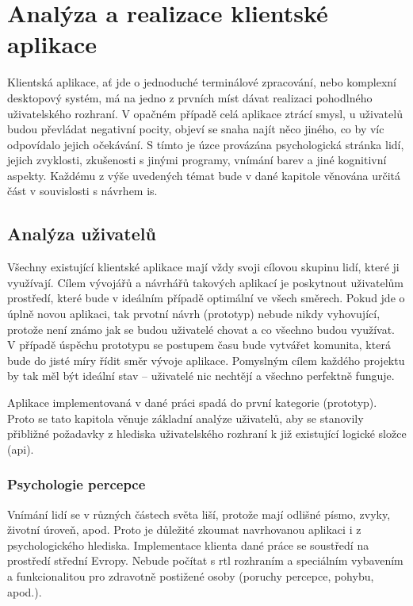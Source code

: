 \chapter{Analýza a realizace klientské aplikace}


Klientská aplikace, ať jde o jednoduché terminálové zpracování, nebo komplexní desktopový systém, má na jedno z prvních míst dávat realizaci pohodlného uživatelského rozhraní. V opačném případě celá aplikace ztrácí smysl, u uživatelů budou převládat negativní pocity, objeví se snaha najít něco jiného, co by víc odpovídalo jejich očekávání. S tímto je úzce provázána psychologická stránka lidí, jejich zvyklosti, zkušenosti s jinými programy, vnímání barev a jiné kognitivní aspekty. Každému z výše uvedených témat bude v dané kapitole věnována určitá část v souvislosti s návrhem \gls{is}.



\section{Analýza uživatelů}

Všechny existující klientské aplikace mají vždy svoji cílovou skupinu lidí, které ji využívají. Cílem vývojářů a návrhářů takových aplikací je poskytnout uživatelům prostředí, které bude v ideálním případě optimální ve všech směrech. Pokud jde o úplně novou aplikaci, tak prvotní návrh (prototyp) nebude nikdy vyhovující, protože není známo jak se budou uživatelé chovat a co všechno budou využívat. V případě úspěchu prototypu se postupem času bude vytvářet komunita, která bude do jisté míry řídit směr vývoje aplikace. Pomyslným cílem každého projektu by tak měl být ideální stav -- uživatelé nic nechtějí a všechno perfektně funguje.

Aplikace implementovaná v dané práci spadá do první kategorie (prototyp). Proto se tato kapitola věnuje základní analýze uživatelů, aby se stanovily přibližné požadavky z hlediska uživatelského rozhraní k již existující logické složce (\gls{api}).


\subsection{Psychologie percepce}

Vnímání lidí se v různých částech světa liší, protože mají odlišné písmo, zvyky, životní úroveň, apod. Proto je důležité zkoumat navrhovanou aplikaci i z psychologického hlediska. Implementace klienta dané práce se soustředí na prostředí střední Evropy. Nebude počítat s \gls{rtl} rozhraním a speciálním vybavením a funkcionalitou pro zdravotně postižené osoby (poruchy percepce, pohybu, apod.). 

